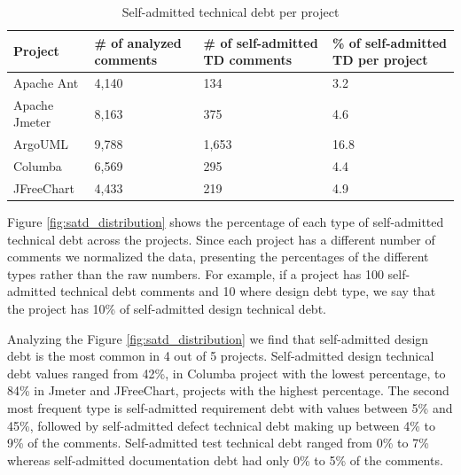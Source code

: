 \begin{table}[!hbt]
     \begin{center}
           \caption{Self-admitted technical debt per project}
           \label{tab:total_self_admitted_per_project}
           \begin{tabular}{l| p{0.75in} p{.7in} p{0.7in} }
           \toprule
           \textbf{Project}      & \textbf{\# of analyzed comments}     & \textbf{\# of self-admitted TD comments} & \textbf{\% of self-admitted TD per project} \\ \midrule 
             Apache Ant          & 4,140                          & 134                                & 3.2  \\                                   
             Apache Jmeter       & 8,163                          & 375                                & 4.6  \\                                   
             ArgoUML             & 9,788                          & 1,653                              & 16.8 \\                                   
             Columba             & 6,569                          & 295                                & 4.4 \\                                   
             JFreeChart          & 4,433                          & 219                                & 4.9  \\ \bottomrule
           \end{tabular}
     \end{center}
\end{table}

Figure \ref{fig:satd_distribution} shows the percentage of each type of self-admitted technical debt across the projects. Since each project has a different number of comments we normalized the data, presenting the percentages of the different types rather than the raw numbers. For example, if a project has 100 self-admitted technical debt comments and 10 where design debt type, we say that the project has 10\% of self-admitted design technical debt. 

Analyzing the Figure \ref{fig:satd_distribution} we find that self-admitted design debt is the most common in 4 out of 5 projects. Self-admitted design technical debt values ranged from 42\%, in Columba project with the lowest percentage, to 84\% in Jmeter and JFreeChart, projects with the highest percentage. The second most frequent type is self-admitted requirement debt with values between 5\% and 45\%, followed by self-admitted defect technical debt making up between 4\% to 9\% of the comments. Self-admitted test technical debt ranged from 0\% to 7\% whereas self-admitted documentation debt had only 0\% to 5\% of the comments.     

